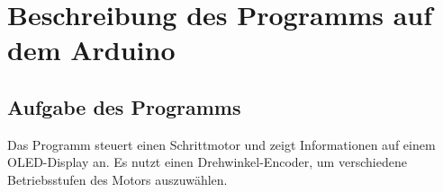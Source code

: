 %
%
%

\chapter{Beschreibung des Programms auf dem Arduino}

\section{Aufgabe des Programms}
Das Programm steuert einen Schrittmotor und zeigt Informationen auf einem OLED-Display an. Es nutzt einen Drehwinkel-Encoder, um verschiedene Betriebsstufen des Motors auszuwählen.

